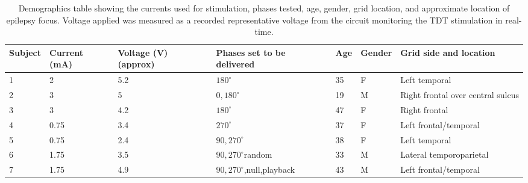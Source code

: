\renewcommand{\tabcolsep}{1pt}
\renewcommand{\arraystretch}{0.7}
\begin{table}[ht]
	\scriptsize
	\begin{tabularx}{\textwidth}{@{}lllXllX@{}}
				\toprule
		Subject & Current (mA) & Voltage (V) (approx) & Phases set to be delivered & Age & Gender & Grid side and location \\
				\midrule
		1 & 2 & 5.2 & $180^{\circ}$ & 35 & F & Left temporal\\
		2 & 3 & 5 & $0,180^{\circ}$ & 19 & M & Right frontal over central sulcus \\
		3 & 3 & 4.2 & $180^{\circ}$ & 47 & F & Right frontal\\
		4 & 0.75 & 3.4 & $270^{\circ}$ & 37 & F & Left frontal/temporal\\
		5 & 0.75 & 2.4 & $90,270^{\circ}$ & 38 & F & Left temporal\\
		6 & 1.75 & 3.5 & $90,270^{\circ}$random & 33 & M & Lateral temporoparietal \\
		7 & 1.75 & 4.9 & $90,270^{\circ}$,null,playback & 43 & M & Left frontal/temporal \\
								\bottomrule		
	\end{tabularx}
	\caption[Subject Demographics]{Demographics table showing the currents used for stimulation, phases tested, age, gender, grid location, and approximate location of epilepsy focus. Voltage applied was measured as a recorded representative voltage from the circuit monitoring the TDT stimulation in real-time.}
	\label{table:betaStimSubj}
\end{table}


